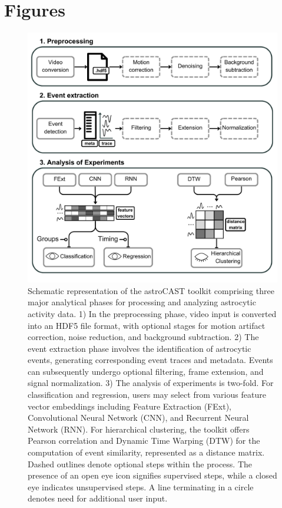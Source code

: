 \documentclass[utf8]{FrontiersinHarvard}
\begin{document}
    \section*{Figures}
    \begin{figure}[!htb]
        \begin{center}
            \includegraphics[width=\linewidth]{figures/1}
        \end{center}
        \caption{Schematic representation of the astroCAST toolkit comprising three major analytical phases for processing and analyzing astrocytic activity data. 1) In the preprocessing phase, video input is converted into an HDF5 file format, with optional stages for motion artifact correction, noise reduction, and background subtraction. 2) The event extraction phase involves the identification of astrocytic events, generating corresponding event traces and metadata. Events can subsequently undergo optional filtering, frame extension, and signal normalization. 3) The analysis of experiments is two-fold. For classification and regression, users may select from various feature vector embeddings including Feature Extraction (FExt), Convolutional Neural Network (CNN), and Recurrent Neural Network (RNN). For hierarchical clustering, the toolkit offers Pearson correlation and Dynamic Time Warping (DTW) for the computation of event similarity, represented as a distance matrix. Dashed outlines denote optional steps within the process. The presence of an open eye icon signifies supervised steps, while a closed eye indicates unsupervised steps. A line terminating in a circle denotes need for additional user input.}\label{fig:1}
    \end{figure}
\end{document}
